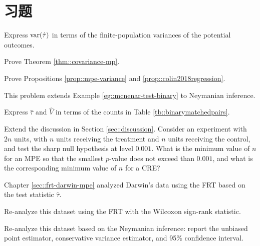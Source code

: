 \section{习题}\label{sec:7-homework}

\begin{HomeworkProblem}\label{exr:7-1}

Express $\textup{var}(\hat{\tau})$ in terms of the finite-population variances of the potential outcomes.

\end{HomeworkProblem}

\begin{HomeworkProblem}\label{exr:7-2}
Prove Theorem \ref{thm::covariance-mp}.

\end{HomeworkProblem}

\begin{HomeworkProblem}\label{exr:7-3}
Prove Propositions \ref{prop::mpe-variance} and \ref{prop::colin2018regression}.


\end{HomeworkProblem}

\begin{HomeworkProblem}\label{exr:7-4}


This problem extends Example \ref{eg::mcnenar-test-binary} to Neymanian inference.

Express $\hat\tau$ and $\hat V$ in terms of the counts in Table \ref{tb::binarymatchedpairs}.




\end{HomeworkProblem}

\begin{HomeworkProblem}\label{exr:7-5}

Extend the discussion in Section \ref{sec::discussion}.  Consider an experiment with $2n$ units, with $n$ units receiving the treatment and $n$ units receiving the control, and test the sharp null hypothesis at level $0.001$. What is the minimum value of $n$ for an MPE so that the smallest $p$-value does not exceed than $0.001$, and what is the corresponding minimum value of $n$ for a CRE?


\end{HomeworkProblem}

\begin{HomeworkProblem}\label{exr:7-6}


Chapter \ref{sec::frt-darwin-mpe} analyzed Darwin's data using the FRT based on the test statistic $\hat{\tau}$.

Re-analyze this dataset using the FRT with the Wilcoxon sign-rank statistic.

Re-analyze this dataset based on the Neymanian inference: report the unbiased point estimator, conservative variance estimator, and 95\% confidence interval.

\end{HomeworkProblem}

